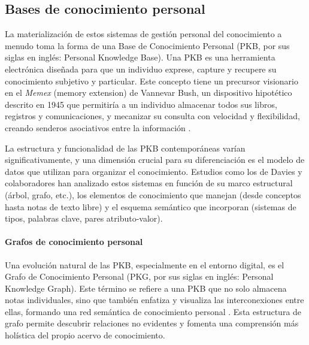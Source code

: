 \subsection{Bases de conocimiento personal}
\label{subsec:bases_conocimiento_personal}

La materialización de estos sistemas de gestión personal del conocimiento a menudo toma la forma de una Base de Conocimiento Personal (PKB, por sus siglas en inglés: Personal Knowledge Base). Una PKB es una herramienta electrónica diseñada para que un individuo exprese, capture y recupere su conocimiento subjetivo y particular. Este concepto tiene un precursor visionario en el \textit{Memex} (memory extension) de Vannevar Bush, un dispositivo hipotético descrito en 1945 que permitiría a un individuo almacenar todos sus libros, registros y comunicaciones, y mecanizar su consulta con velocidad y flexibilidad, creando senderos asociativos entre la información \citep{bushWeMayThink1945}.

La estructura y funcionalidad de las PKB contemporáneas varían significativamente, y una dimensión crucial para su diferenciación es el modelo de datos que utilizan para organizar el conocimiento. Estudios como los de Davies y colaboradores \citep{daviesBuildingMemexSixty, daviesStillBuildingMemex2011} han analizado estos sistemas en función de su marco estructural (árbol, grafo, etc.), los elementos de conocimiento que manejan (desde conceptos hasta notas de texto libre) y el esquema semántico que incorporan (sistemas de tipos, palabras clave, pares atributo-valor).

\paragraph{Grafos de conocimiento personal}
\label{par:grafos_conocimiento_personal}
Una evolución natural de las PKB, especialmente en el entorno digital, es el Grafo de Conocimiento Personal (PKG, por sus siglas en inglés: Personal Knowledge Graph). Este término se refiere a una PKB que no solo almacena notas individuales, sino que también enfatiza y visualiza las interconexiones entre ellas, formando una red semántica de conocimiento personal \citep{pyneMetaworkHowWe2022}. Esta estructura de grafo permite descubrir relaciones no evidentes y fomenta una comprensión más holística del propio acervo de conocimiento.

